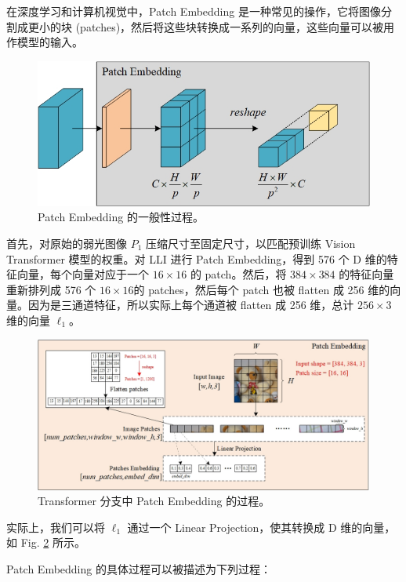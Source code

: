 \documentclass[a4paper]{ctexart}
\begin{document}
	在深度学习和计算机视觉中，Patch Embedding 是一种常见的操作，它将图像分割成更小的块 (patches)，然后将这些块转换成一系列的向量，这些向量可以被用作模型的输入。
	
	\begin{figure}[htb]
		\centering 
		\includegraphics[width=0.5\columnwidth]{picture/LLIE/My Architecture/Patch Embedding}
		\caption{
			\label{fig: Patch Embedding} 
			Patch Embedding 的一般性过程。
		}
	\end{figure}
	
	首先，对原始的弱光图像 $P_1$ 压缩尺寸至固定尺寸，以匹配预训练 Vision Transformer 模型的权重。对 LLI 进行 Patch Embedding，得到 576 个 D 维的特征向量，每个向量对应于一个 $16 \times 16$ 的 patch。然后，将 $384 \times 384$ 的特征向量重新排列成 576 个 $16 \times 16$的 patches，然后每个 patch 也被 flatten 成 256 维的向量。因为是三通道特征，所以实际上每个通道被 flatten 成 256 维，总计 $256 \times 3$ 维的向量 $\ell_1$。
	
	\begin{figure}[htb]
		\centering 
		\includegraphics[width=0.8\columnwidth]{picture/LLIE/My Architecture/Patch Embedding(ViT)}
		\caption{
			\label{fig: Patch Embedding(ViT)} 
			Transformer 分支中 Patch Embedding 的过程。
		}
	\end{figure}
	
	实际上，我们可以将 $\ell_1$ 通过一个 Linear Projection，使其转换成 D 维的向量，如 Fig. \ref{fig: Patch Embedding(ViT)} 所示。
	
	Patch Embedding 的具体过程可以被描述为下列过程：
	
\end{document}
